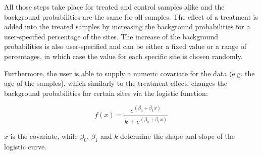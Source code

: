 All those steps take place for treated and control samples alike and the background probabilities are the same for all samples.
The effect of a treatment is added into the treated samples by increasing the background probabilities for a user-specified percentage of the sites. The increase of the background probabilities is also user-specified and can be either a fixed value or a range of percentages, in which case the value for each specific site is chosen randomly.

Furthermore, the user is able to supply a numeric covariate for the data (e.g. the age of the samples), which similarly to the treatment effect, changes the background probabilities for certain sites via the logistic function:

\[f(x) = \frac{e^{(\beta_{0} + \beta_{1}x)}}{k+e^{(\beta_{0} + \beta_{1}x)}}\]

$x$ is the covariate, while $\beta_{0}$, $\beta_{1}$ and $k$ determine the shape and slope of the logistic curve.
  
  
  
  